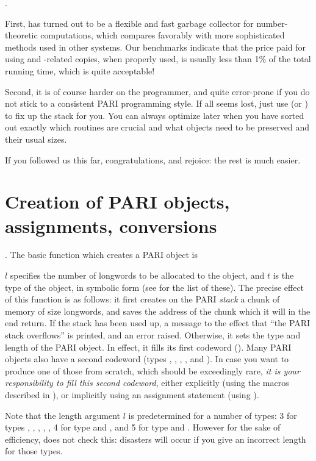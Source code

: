 .

First,  has turned out to be a flexible and fast garbage
collector for number-theoretic computations, which compares favorably with
more sophisticated methods used in other systems. Our benchmarks indicate
that the price paid for using  and -related
copies, when properly used, is usually less than 1\% of the total
running time, which is quite acceptable!

Second, it is of course harder on the programmer, and quite error-prone
if you do not stick to a consistent PARI programming style. If all seems
lost, just use  (or ) to fix up the stack
for you. You can always optimize later when you have sorted out exactly which
routines are crucial and what objects need to be preserved and their usual
sizes.

\smallskip If you followed us this far, congratulations, and rejoice: the
rest is much easier.

\section{Creation of PARI objects, assignments, conversions}

.
The basic function which creates a PARI object is

$l$ specifies the number of longwords to be allocated to the
object, and $t$ is the type of the object, in symbolic
form (see  for the list of these). The precise effect of
this function is as follows: it first creates on the PARI \emph{stack} a
chunk of memory of size  longwords, and saves the address of the
chunk which it will in the end return. If the stack has been used up, a
message to the effect that ``the PARI stack overflows'' is printed,
and an error raised. Otherwise, it sets the type and length of the PARI object.
In effect, it fills its first codeword (). Many PARI
objects also have a second codeword (types , ,
, , and ). In case you want to produce one of
those from scratch, which should be exceedingly rare, \emph{it is your
responsibility to fill this second codeword}, either explicitly (using the
macros described in ), or implicitly using an assignment
statement (using ).

Note that the length argument $l$ is predetermined for a number of types:
3 for types , , , ,
, 4 for type  and , and 5 for type 
and . However for the sake of efficiency, 
 does not check this: disasters will occur if you give an incorrect
length for those types.

